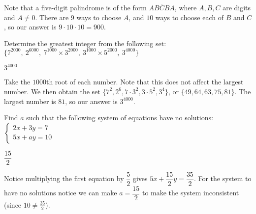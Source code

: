\documentclass[11pt]{article}
\begin{document}
\begin{solution}
Note that a five-digit palindrome is of the form $\overline{ABCBA}$, where $A,B,C$ are digits and $A \ne 0$. There are $9$ ways to choose $A$, and $10$ ways to choose each of $B$ and $C$, so our answer is $9 \cdot 10 \cdot 10 = \boxed{900}$.
\end{solution}

\begin{problem}
Determine the greatest integer from the following set: $\{7^{2000},\  2^{6000},\ 7^{1000} \times 3^{2000},\ 3^{1000} \times 5^{2000},\ 3^{4000} \}$
\end{problem}

\begin{answer}
$\boxed{3^{4000}}$
\end{answer}

\begin{solution}
Take the $1000$th root of each number. Note that this does not affect the largest number. We then obtain the set $\{7^2, 2^6, 7 \cdot 3^2, 3 \cdot 5^2, 3^4\}$, or $\{49, 64, 63, 75, 81\}$. The largest number is $81$, so our answer is $\boxed{3^{4000}}$.
\end{solution}

\begin{problem}
Find $a$ such that the following system of equations have no solutions: $\begin{cases} 2x + 3y = 7 \\ 5x + ay = 10 \end{cases}$
\end{problem}

\begin{answer}
$\boxed{\dfrac{15}{2}}$
\end{answer}

\begin{solution}
Notice multiplying the first equation by $\dfrac{5}{2}$ gives $5x + \dfrac{15}{2}y = \dfrac{35}{2}$. For the system to have no solutions notice we can make $a = \boxed{\dfrac{15}{2}}$ to make the system inconsistent (since $10 \ne \frac{35}{2}$). 
\end{solution}

%
%
\end{document}
